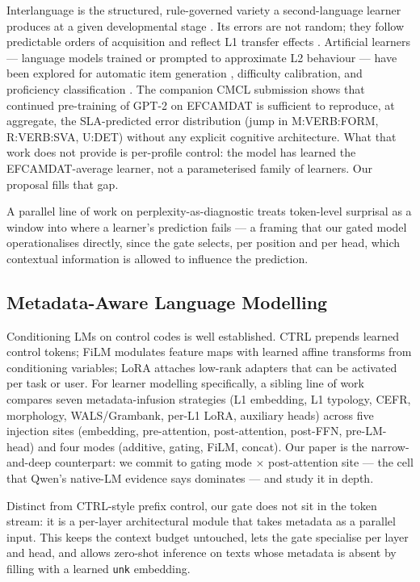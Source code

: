 Interlanguage is the structured, rule-governed variety a second-language
learner produces at a given developmental stage \citep{selinker1972interlanguage}.
Its errors are not random; they follow predictable orders of acquisition
\citep{goldschneider2001explaining} and reflect L1 transfer effects
\citep{ionin2004article}. Artificial learners --- language models
trained or prompted to approximate L2 behaviour --- have been explored
for automatic item generation \citep{benedetto2024llmsimulation},
difficulty calibration, and proficiency classification
\citep{stearns2026al-cefr}. The companion CMCL submission
\citep{stearns2026artificial} shows that continued pre-training of
GPT-2 on EFCAMDAT is sufficient to reproduce, at aggregate, the SLA-predicted
error distribution (jump in M:VERB:FORM, R:VERB:SVA, U:DET) without any
explicit cognitive architecture. What that work does not provide is
per-profile control: the model has learned the EFCAMDAT-average
learner, not a parameterised family of learners. Our proposal fills
that gap.

A parallel line of work on perplexity-as-diagnostic
\citep{stearns2025nwpaleval} treats token-level surprisal as a window
into where a learner's prediction fails --- a framing that our gated
model operationalises directly, since the gate selects, per position and
per head, which contextual information is allowed to influence the
prediction.

\subsection{Metadata-Aware Language Modelling}

Conditioning LMs on control codes is well established. CTRL
\citep{keskar2019ctrl} prepends learned control tokens; FiLM
\citep{perez2018film} modulates feature maps with learned affine
transforms from conditioning variables; LoRA \citep{hu2022lora} attaches
low-rank adapters that can be activated per task or user. For learner
modelling specifically, a sibling line of work \citep{stearns2026metadata-aware}
compares seven metadata-infusion strategies (L1 embedding, L1 typology,
CEFR, morphology, WALS/Grambank, per-L1 LoRA, auxiliary heads) across
five injection sites (embedding, pre-attention, post-attention,
post-FFN, pre-LM-head) and four modes (additive, gating, FiLM, concat).
Our paper is the narrow-and-deep counterpart: we commit to gating mode
$\times$ post-attention site --- the cell that Qwen's native-LM evidence
says dominates --- and study it in depth.

Distinct from CTRL-style prefix control, our gate does not sit in the
token stream: it is a per-layer architectural module that takes
metadata as a parallel input. This keeps the context budget untouched,
lets the gate specialise per layer and head, and allows zero-shot
inference on texts whose metadata is absent by filling with a learned
\texttt{unk} embedding.
